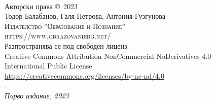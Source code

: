 ~\vfill
\thispagestyle{empty}

\noindent Авторски права \copyright\ 2023 \\

\noindent Тодор Балабанов, Галя Петрова, Антония Гузгунова \\ 

\noindent \textsc{Издателство ''Образование и Познание''} \\
\noindent \textsc{https://www.obrazovaniebg.net/} \\

\noindent Разпространява се под свободен лиценз: \\ 
Creative Commons Attribution-NonCommercial-NoDerivatives 4.0 \\
International Public License \\
\url{https://creativecommons.org/licenses/by-nc-nd/4.0} \\

. \\

\noindent \textit{Първо издание, 2023}

